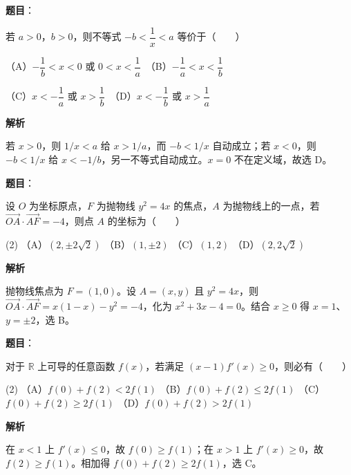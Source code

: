 \begin{answer}

\textbf{题目}：

若 $a>0\text{，}b>0$，则不等式 $-b<\dfrac1x<a$ 等价于\mbox{（　　）}

（A）$-\dfrac1b<x<0$ 或 $0<x<\dfrac1a$　（B）$-\dfrac1a<x<\dfrac1b$

（C）$x<-\dfrac1a$ 或 $x>\dfrac1b$　（D）$x<-\dfrac1b$ 或 $x>\dfrac1a$

\textbf{解析}

若 $x>0$，则 $1/x<a$ 给 $x>1/a$，而 $-b<1/x$ 自动成立；若 $x<0$，则 $-b<1/x$ 给 $x<-1/b$，另一不等式自动成立。$x=0$ 不在定义域，故选 D。


\end{answer}
\begin{answer}

\textbf{题目}：

设 $O$ 为坐标原点，$F$ 为抛物线 $y^2=4x$ 的焦点，$A$ 为抛物线上的一点，若 $\overrightarrow{OA}\cdot\overrightarrow{AF}=-4$，则点 $A$ 的坐标为\mbox{（　　）}

\begin{gkopts}(2)
\task （A）$(2,\pm2\sqrt2)$
\task （B）$(1,\pm2)$
\task （C）$(1,2)$
\task （D）$(2,2\sqrt2)$
\end{gkopts}

\textbf{解析}

抛物线焦点为 $F=(1,0)$。设 $A=(x,y)$ 且 $y^2=4x$，则 $\overrightarrow{OA}\cdot\overrightarrow{AF}=x(1-x)-y^2=-4$，化为 $x^2+3x-4=0$。结合 $x\ge0$ 得 $x=1$、$y=\pm2$，选 B。


\end{answer}
\begin{answer}

\textbf{题目}：

对于 $\mathbb R$ 上可导的任意函数 $f(x)$，若满足 $(x-1)f'(x)\geqslant0$，则必有\mbox{（　　）}

\begin{gkopts}(2)
\task （A）$f(0)+f(2)<2f(1)$
\task （B）$f(0)+f(2)\leqslant2f(1)$
\task （C）$f(0)+f(2)\geqslant2f(1)$
\task （D）$f(0)+f(2)>2f(1)$
\end{gkopts}

\textbf{解析}

在 $x<1$ 上 $f'(x)\le0$，故 $f(0)\ge f(1)$；在 $x>1$ 上 $f'(x)\ge0$，故 $f(2)\ge f(1)$。相加得 $f(0)+f(2)\ge2f(1)$，选 C。


\end{answer}

